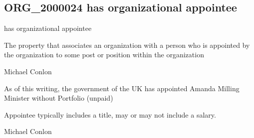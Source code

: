 \documentclass[letterpaper,10pt,english]{sphinxmanual}
\begin{document}
\subsection{ORG\_2000024 \sphinxhyphen{} has organizational appointee}
\label{\detokenize{doc-ORG_2000024:org-2000024-has-organizational-appointee}}\label{\detokenize{doc-ORG_2000024:index-0}}\label{\detokenize{doc-ORG_2000024::doc}}
\begin{sphinxShadowBox}

\sphinxAtStartPar
has organizational appointee
\end{sphinxShadowBox}

\begin{sphinxShadowBox}

\sphinxAtStartPar
The property that associates an organization with a person who is appointed by the organization to some post or position within the organization
\end{sphinxShadowBox}

\begin{sphinxShadowBox}

\sphinxAtStartPar
Michael Conlon 
\end{sphinxShadowBox}

\begin{sphinxShadowBox}

\sphinxAtStartPar
As of this writing, the government of the UK has appointed Amanda Milling Minister without Portfolio (unpaid)
\end{sphinxShadowBox}

\begin{sphinxShadowBox}

\sphinxAtStartPar
Appointee typically includes a title, may or may not include a salary.
\end{sphinxShadowBox}

\begin{sphinxShadowBox}

\sphinxAtStartPar
Michael Conlon 
\end{sphinxShadowBox}
\begin{quote}

\ignorespaces \end{quote}
\end{document}
